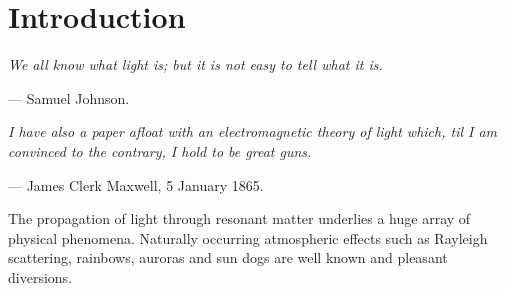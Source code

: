 \chapter[Introduction]
  {Introduction}
  \label{chp:intro}

  \begin{displayquote}
    \textit{
    We all \textrm{know} what light is; but it is not easy to \textrm{tell} what
    it is.
    }
    \begin{flushright}
      --- Samuel Johnson.
    \end{flushright}
  \end{displayquote} 

  \begin{displayquote}
  \textit{
  I have also a paper afloat with an electromagnetic theory of light which, til
  I am convinced to the contrary, I hold to be great guns.
  }\\
    \begin{flushright}
      --- James Clerk Maxwell, 5 January 1865.
    \end{flushright}
  \end{displayquote}


    The propagation of light through resonant matter underlies a huge array of
    physical phenomena. Naturally occurring atmospheric effects such as Rayleigh
    scattering, rainbows, auroras and sun dogs are well known and pleasant
    diversions.



